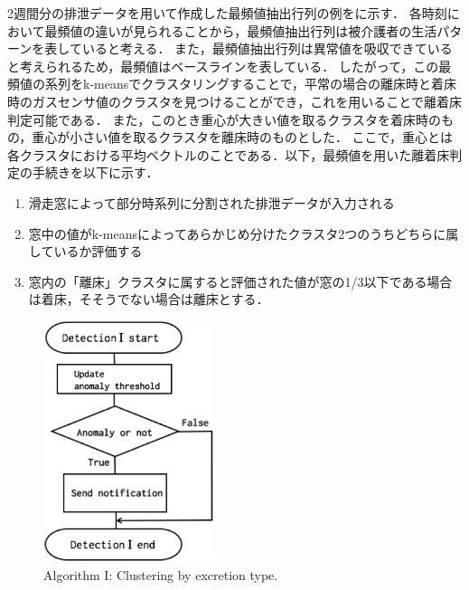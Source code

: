 2週間分の排泄データを用いて作成した最頻値抽出行列の例をに示す．
各時刻において最頻値の違いが見られることから，最頻値抽出行列は被介護者の生活パターンを表していると考える．
また，最頻値抽出行列は異常値を吸収できていると考えられるため，最頻値はベースラインを表している．
したがって，この最頻値の系列をk-meansでクラスタリングすることで，平常の場合の離床時と着床時のガスセンサ値のクラスタを見つけることができ，これを用いることで離着床判定可能である．
また，このとき重心が大きい値を取るクラスタを着床時のもの，重心が小さい値を取るクラスタを離床時のものとした．
ここで，重心とは各クラスタにおける平均ベクトルのことである．以下，最頻値を用いた離着床判定の手続きを以下に示す．


\begin{enumerate}
\item 滑走窓によって部分時系列に分割された排泄データが入力される
\item 窓中の値がk-meansによってあらかじめ分けたクラスタ2つのうちどちらに属しているか評価する
\item 窓内の「離床」クラスタに属すると評価された値が窓の1/3以下である場合は着床，そそうでない場合は離床とする．
\end{enumerate}


\begin{figure}[t]
\centering
\includegraphics[width=5cm]{./fig/detection1.eps}
\caption{Algorithm I: Clustering by excretion type.}
\label{cluster1}
\end{figure}


